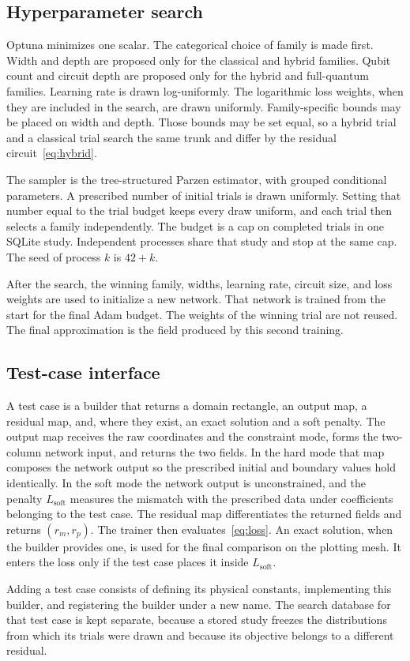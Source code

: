 \documentclass[11pt]{article}
\begin{document}
\subsection{Hyperparameter search}

Optuna minimizes one scalar. The categorical choice of family is made
first. Width and depth are proposed only for the classical and hybrid
families. Qubit count and circuit depth are proposed only for the hybrid
and full-quantum families. Learning rate is drawn log-uniformly. The
logarithmic loss weights, when they are included in the search, are drawn
uniformly. Family-specific bounds may be placed on width and depth. Those
bounds may be set equal, so a hybrid trial and a classical trial search
the same trunk and differ by the residual circuit~\eqref{eq:hybrid}.

The sampler is the tree-structured Parzen estimator, with grouped
conditional parameters. A prescribed number of initial trials is drawn
uniformly. Setting that number equal to the trial budget keeps every draw
uniform, and each trial then selects a family independently. The budget
is a cap on completed trials in one SQLite study. Independent processes
share that study and stop at the same cap. The seed of process \(k\) is
\(42+k\).

After the search, the winning family, widths, learning rate, circuit
size, and loss weights are used to initialize a new network. That network
is trained from the start for the final Adam budget. The weights of the
winning trial are not reused. The final approximation is the field
produced by this second training.

\subsection{Test-case interface}
\label{sec:interface}

A test case is a builder that returns a domain rectangle, an output map,
a residual map, and, where they exist, an exact solution and a soft
penalty. The output map receives the raw coordinates and the constraint
mode, forms the two-column network input, and returns the two fields.
In the hard mode that map composes the network output so the prescribed
initial and boundary values hold identically. In the soft mode the
network output is unconstrained, and the penalty \(L_{\mathrm{soft}}\)
measures the mismatch with the prescribed data under coefficients
belonging to the test case. The residual map differentiates the returned
fields and returns \((r_{m},r_{p})\). The trainer then
evaluates~\eqref{eq:loss}. An exact solution, when the builder provides
one, is used for the final comparison on the plotting mesh. It enters
the loss only if the test case places it inside \(L_{\mathrm{soft}}\).

Adding a test case consists of defining its physical constants,
implementing this builder, and registering the builder under a new name.
The search database for that test case is kept separate, because a stored
study freezes the distributions from which its trials were drawn and
because its objective belongs to a different residual.
\end{document}
